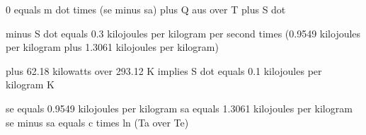 0 equals m dot times (se minus sa) plus Q aus over T plus S dot

minus S dot equals 0.3 kilojoules per kilogram per second times (0.9549 kilojoules per kilogram plus 1.3061 kilojoules per kilogram)

plus 62.18 kilowatts over 293.12 K implies S dot equals 0.1 kilojoules per kilogram K

se equals 0.9549 kilojoules per kilogram
sa equals 1.3061 kilojoules per kilogram
se minus sa equals c times ln (Ta over Te)